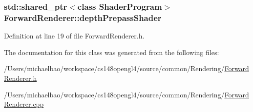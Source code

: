\subsubsection[{depth\+Prepass\+Shader}]{\setlength{\rightskip}{0pt plus 5cm}std\+::shared\+\_\+ptr$<$class {\bf Shader\+Program}$>$ Forward\+Renderer\+::depth\+Prepass\+Shader\hspace{0.3cm}{\ttfamily [protected]}}\label{class_forward_renderer_a8f703bc4c646416804bc82f4d220a648}


Definition at line 19 of file Forward\+Renderer.\+h.



The documentation for this class was generated from the following files\+:\begin{DoxyCompactItemize}
\item 
/\+Users/michaelbao/workspace/cs148opengl4/source/common/\+Rendering/\hyperlink{_forward_renderer_8h}{Forward\+Renderer.\+h}\item 
/\+Users/michaelbao/workspace/cs148opengl4/source/common/\+Rendering/\hyperlink{_forward_renderer_8cpp}{Forward\+Renderer.\+cpp}\end{DoxyCompactItemize}
